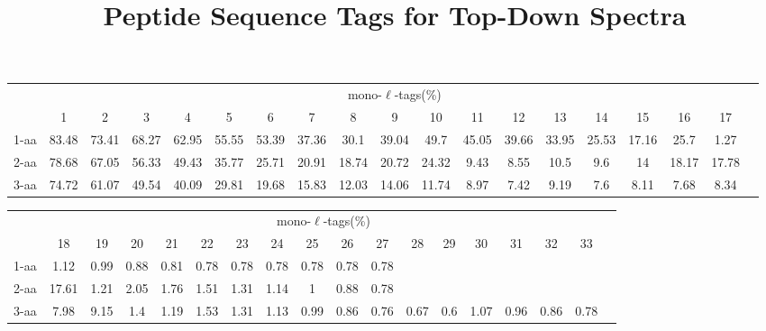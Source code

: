 \documentclass{article}[12pt]
\title{Peptide Sequence Tags for Top-Down Spectra}
\author{}
\begin{document}
\maketitle

\doublespacing
\begin{abstract}


\end{abstract}


\begin{landscape}

\begin{table}[h]\tiny
\vspace{3mm}
{\centering
\begin{center}
\begin{tabular}{|l|c|c|c|c|c|c|c|c|c|c|c|c|c|c|c|c|c|c|}
  \hline
  & \multicolumn{ 17 }{|c|}{mono-$\ell$-tags(\%)} \\
  \cline{2- 18}
    & 1 & 2 & 3 & 4 & 5 & 6 & 7 & 8 & 9 & 10 & 11 & 12 & 13 & 14 & 15 & 16 & 17\\
  \hline
1-aa  & 83.48 & 73.41 & 68.27 & 62.95 & 55.55 & 53.39 & 37.36 & 30.1 & 39.04 & 49.7 & 45.05 & 39.66 & 33.95 & 25.53 & 17.16 & 25.7 & 1.27\\
2-aa  & 78.68 & 67.05 & 56.33 & 49.43 & 35.77 & 25.71 & 20.91 & 18.74 & 20.72 & 24.32 & 9.43 & 8.55 & 10.5 & 9.6 & 14 & 18.17 & 17.78\\
3-aa  & 74.72 & 61.07 & 49.54 & 40.09 & 29.81 & 19.68 & 15.83 & 12.03 & 14.06 & 11.74 & 8.97 & 7.42 & 9.19 & 7.6 & 8.11 & 7.68 & 8.34\\
 \hline
\end{tabular}
\end{center}
\par}
\centering

\vspace{3mm}
\end{table}
\begin{table}[h]\tiny
\vspace{3mm}
{\centering
\begin{center}
\begin{tabular}{|l|c|c|c|c|c|c|c|c|c|c|c|c|c|c|c|c|c|}
  \hline
  & \multicolumn{ 16 }{|c|}{mono-$\ell$-tags(\%)} \\
  \cline{2- 17}
    & 18 & 19 & 20 & 21 & 22 & 23 & 24 & 25 & 26 & 27 & 28 & 29 & 30 & 31 & 32 & 33\\
  \hline
1-aa  & 1.12 & 0.99 & 0.88 & 0.81 & 0.78 & 0.78 & 0.78 & 0.78 & 0.78 & 0.78 &  &  &  &  &  & \\
2-aa  & 17.61 & 1.21 & 2.05 & 1.76 & 1.51 & 1.31 & 1.14 & 1 & 0.88 & 0.78 &  &  &  &  &  & \\
3-aa  & 7.98 & 9.15 & 1.4 & 1.19 & 1.53 & 1.31 & 1.13 & 0.99 & 0.86 & 0.76 & 0.67 & 0.6 & 1.07 & 0.96 & 0.86 & 0.78\\
 \hline
\end{tabular}
\end{center}
\par}
\centering


\end{table}
\end{landscape}
\end{document}
